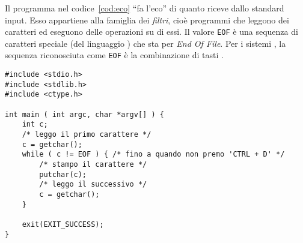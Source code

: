 Il programma nel codice~\vref{cod:eco} ``fa l'eco'' di quanto riceve dallo standard input.
Esso appartiene alla famiglia dei \emph{filtri}, cioè programmi che leggono dei caratteri ed eseguono delle operazioni su di essi.
Il valore \lstinline!EOF! è una sequenza di caratteri speciale (del linguaggio ) che sta per \emph{End Of File}.
Per i sistemi , la sequenza riconosciuta come \lstinline!EOF! è la combinazione di tasti . 
\begin{lstlisting}[caption={\em Esempio di filtro.}, label={cod:eco}]
#include <stdio.h>
#include <stdlib.h>
#include <ctype.h>

int main ( int argc, char *argv[] ) {
	int c;
	/* leggo il primo carattere */
	c = getchar();
	while ( c != EOF ) { /* fino a quando non premo 'CTRL + D' */
		/* stampo il carattere */
		putchar(c);
		/* leggo il successivo */
		c = getchar();
	}

	exit(EXIT_SUCCESS);
}
\end{lstlisting}